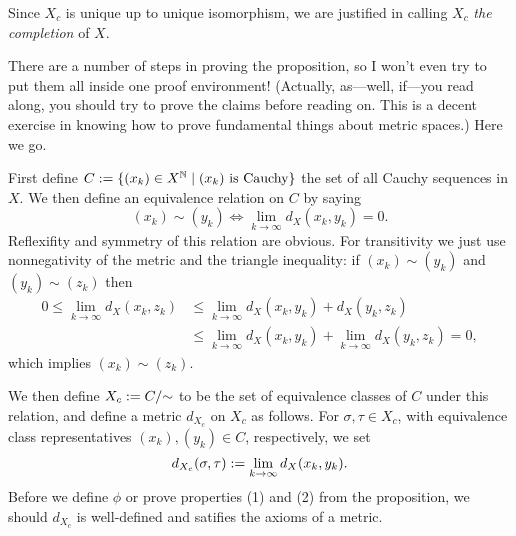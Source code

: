 \begin{definition}
  Since $X_c$ is unique up to unique isomorphism, we are justified in
  calling $X_c$ \textit{the completion} of $X$.
\end{definition}

There are a number of steps in proving the proposition, so I won't
even try to put them all inside one proof environment! (Actually,
as---well, if---you read along, you should try to prove the claims
before reading on. This is a decent exercise in knowing how to prove
fundamental things about metric spaces.) Here we go.


\begin{nothing}[Construction]
  First define $C \mathrel{:=} \{(x_k) \in X^{\mathbb{N}} \mid (x_k)\text{ is
    Cauchy}\}$ the set of all Cauchy sequences in $X$. We then define
  an equivalence relation on $C$ by saying
  \[
  (x_k) \sim (y_k) \iff \lim_{k \to \infty} d_X(x_k,y_k) = 0.
  \]
  Reflexifity and symmetry of this relation are obvious. For
  transitivity we just use nonnegativity of the metric and the
  triangle inequality: if $(x_k) \sim (y_k)$ and $(y_k) \sim (z_k)$
  then
  \begin{align*}
    0 \le \lim_{k \to \infty} d_X(x_k,z_k) &\le \lim_{k \to \infty}
    d_X(x_k,y_k) + d_X(y_k,z_k) \\ &\le \lim_{k \to \infty} d_X(x_k,y_k) +
    \lim_{k \to \infty} d_X(y_k,z_k) = 0,
  \end{align*}
  which implies $(x_k) \sim (z_k)$.

  We then define $X_c \mathrel{:=} C/{\sim}$ to be the set of equivalence
  classes of $C$ under this relation, and define a metric $d_{X_c}$ on
  $X_c$ as follows. For $\sigma, \tau \in X_c$, with equivalence class
  representatives $(x_k), (y_k) \in C$, respectively, we set
  \[
  d_{X_c}(\sigma, \tau) \mathrel{:=} \lim_{k \to \infty} d_X(x_k, y_k).
  \]
  Before we define $\phi$ or prove properties (1) and (2) from the
  proposition, we should $d_{X_c}$ is well-defined and satifies the
  axioms of a metric.
\end{nothing}

